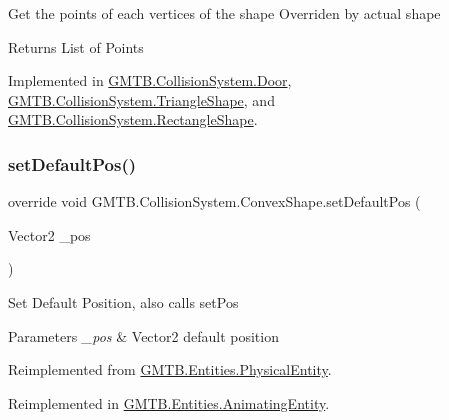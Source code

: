 Get the points of each vertices of the shape Overriden by actual shape 

\begin{DoxyReturn}{Returns}
List of Points
\end{DoxyReturn}


Implemented in \mbox{\hyperlink{class_g_m_t_b_1_1_collision_system_1_1_door_ae6c1c2e7efb9fe03a930b0967de1b819}{G\+M\+T\+B.\+Collision\+System.\+Door}}, \mbox{\hyperlink{class_g_m_t_b_1_1_collision_system_1_1_triangle_shape_afe82a9ab85c8bf9404319a3465cbb286}{G\+M\+T\+B.\+Collision\+System.\+Triangle\+Shape}}, and \mbox{\hyperlink{class_g_m_t_b_1_1_collision_system_1_1_rectangle_shape_a767bc8cd54c3eaafb7a0e8a7080e0a37}{G\+M\+T\+B.\+Collision\+System.\+Rectangle\+Shape}}.

\mbox{\label{class_g_m_t_b_1_1_collision_system_1_1_convex_shape_ab31e50bc6e7ae58970eb512355608184}} 
\subsubsection{\texorpdfstring{setDefaultPos()}{setDefaultPos()}}
{\footnotesize\ttfamily override void G\+M\+T\+B.\+Collision\+System.\+Convex\+Shape.\+set\+Default\+Pos (\begin{DoxyParamCaption}\item[{Vector2}]{\+\_\+pos }\end{DoxyParamCaption})\hspace{0.3cm}{\ttfamily [virtual]}}



Set Default Position, also calls set\+Pos 


\begin{DoxyParams}{Parameters}
{\em \+\_\+pos} & Vector2 default position\\
\hline
\end{DoxyParams}


Reimplemented from \mbox{\hyperlink{class_g_m_t_b_1_1_entities_1_1_physical_entity_a385d1513107094da5ca2955e91a44bb6}{G\+M\+T\+B.\+Entities.\+Physical\+Entity}}.



Reimplemented in \mbox{\hyperlink{class_g_m_t_b_1_1_entities_1_1_animating_entity_a34e8160516927afb278915c3211b38c5}{G\+M\+T\+B.\+Entities.\+Animating\+Entity}}.


